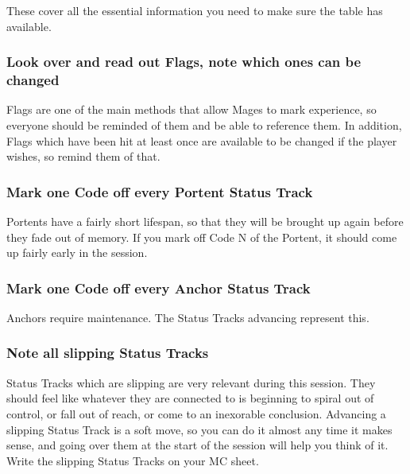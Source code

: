 \documentclass[
  oneside,
  statementpaper,
  9pt]{memoir}
\begin{document}
These cover all the essential information you need to make sure the
table has available.

\hypertarget{look-over-and-read-out-flags-note-which-ones-can-be-changed}{%
\subsubsection{Look over and read out Flags, note which ones can be
changed}\label{look-over-and-read-out-flags-note-which-ones-can-be-changed}}

Flags are one of the main methods that allow Mages to mark experience,
so everyone should be reminded of them and be able to reference them. In
addition, Flags which have been hit at least once are available to be
changed if the player wishes, so remind them of that.

\hypertarget{mark-one-code-off-every-portent-status-track}{%
\subsubsection{Mark one Code off every Portent Status
Track}\label{mark-one-code-off-every-portent-status-track}}

Portents have a fairly short lifespan, so that they will be brought up
again before they fade out of memory. If you mark off Code N of the
Portent, it should come up fairly early in the session.

\hypertarget{mark-one-code-off-every-anchor-status-track}{%
\subsubsection{Mark one Code off every Anchor Status
Track}\label{mark-one-code-off-every-anchor-status-track}}

Anchors require maintenance. The Status Tracks advancing represent this.

\hypertarget{note-all-slipping-status-tracks}{%
\subsubsection{Note all slipping Status
Tracks}\label{note-all-slipping-status-tracks}}

Status Tracks which are slipping are very relevant during this session.
They should feel like whatever they are connected to is beginning to
spiral out of control, or fall out of reach, or come to an inexorable
conclusion. Advancing a slipping Status Track is a soft move, so you can
do it almost any time it makes sense, and going over them at the start
of the session will help you think of it. Write the slipping Status
Tracks on your MC sheet.
\end{document}
